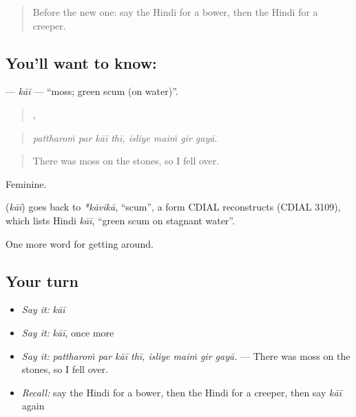 \label{lesson:HI-C447-kai}



\begin{quote}
Before the new one: say the Hindi for a bower, then the Hindi for a creeper.
\end{quote}

\subsection*{You'll want to know: }
\textbf{} — \emph{kāī} — \textquotedblleft{}moss; green scum (on water)\textquotedblright{}.

\begin{quote}
   ,    
\end{quote}

\begin{quote}
\emph{pattharoṁ par kāī thī, isliye maiṁ gir gayā.}
\end{quote}

\begin{quote}
There was moss on the stones, so I fell over.
\end{quote}

Feminine.

\begin{cousinweb}
\textbf{} (\emph{kāī}) goes back to \emph{*kāvikā}, \textquotedblleft{}scum\textquotedblright{}, a form CDIAL reconstructs (CDIAL 3109), which lists Hindi \emph{kāī}, \textquotedblleft{}green scum on stagnant water\textquotedblright{}.
\end{cousinweb}

\begin{grammarlens}[title={What you've built}]
One more word for getting around.
\end{grammarlens}

\subsection*{Your turn}
\begin{itemize}
\raggedright
  \item \emph{Say it:} \emph{kāī}
  \item \emph{Say it:} \emph{kāī}, once more
  \item \emph{Say it:} \emph{pattharoṁ par kāī thī, isliye maiṁ gir gayā.} — There was moss on the stones, so I fell over.
  \item \emph{Recall:} say the Hindi for a bower, then the Hindi for a creeper, then say \emph{kāī} again
\end{itemize}


